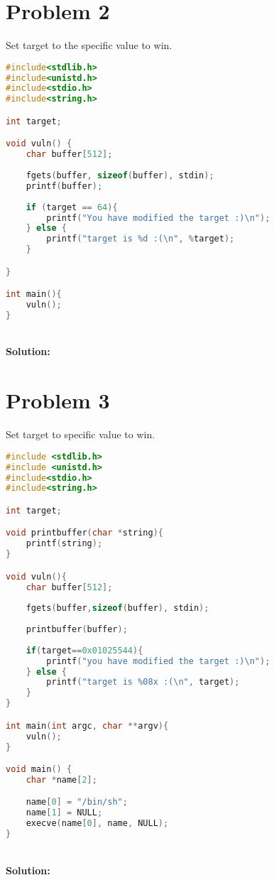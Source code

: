 \documentclass[10.9pt]{article}
\newcommand\tab[1][0.5cm]{\hspace*{#1}}
\begin{document}
\section{Problem 2}
\tab Set target to the specific value to win.


\begin{lstlisting}[language=C]
#include<stdlib.h>
#include<unistd.h>
#include<stdio.h>
#include<string.h>

int target;

void vuln() {
	char buffer[512];
	
	fgets(buffer, sizeof(buffer), stdin);
	printf(buffer);
	
	if (target == 64){
		printf("You have modified the target :)\n");
	} else {
		printf("target is %d :(\n", %target);
	}

}

int main(){
	vuln();
}
\end{lstlisting}
\textbf{\\Solution:\\}


\section{Problem 3}
\tab Set target to specific value to win.
\begin{lstlisting}[language=C]
#include <stdlib.h>
#include <unistd.h>
#include<stdio.h>
#include<string.h>

int target;

void printbuffer(char *string){
	printf(string);
}

void vuln(){
	char buffer[512];
	
	fgets(buffer,sizeof(buffer), stdin);
	
	printbuffer(buffer);
	
	if(target==0x01025544){
		printf("you have modified the target :)\n");
	} else {
		printf("target is %08x :(\n", target);
	}
}

int main(int argc, char **argv){
	vuln();
}

void main() {
	char *name[2];

	name[0] = "/bin/sh";
	name[1] = NULL;
	execve(name[0], name, NULL);
}
\end{lstlisting}
\textbf{\\Solution:\\}
\end{document}
